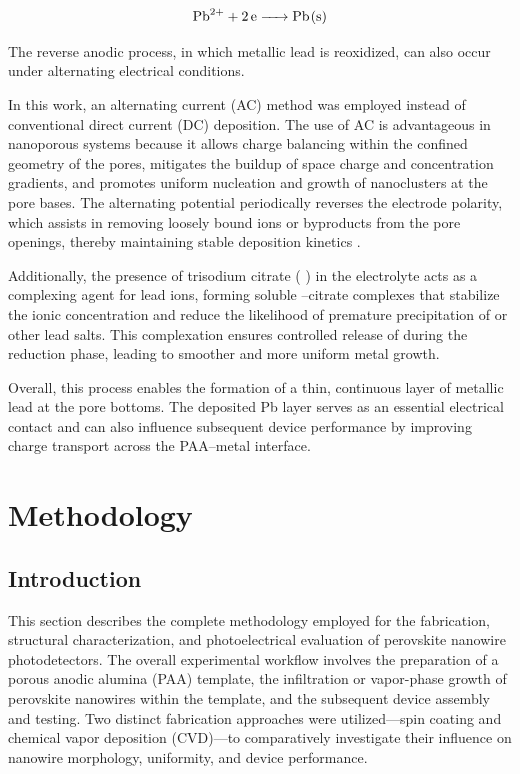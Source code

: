 \documentclass{rapportCS}
\begin{document}
	\begin{equation}
		\ce{Pb^{2+} + 2e -> Pb(s)}
		\label{eq:PbCathode}
	\end{equation}
	
	The reverse anodic process, in which metallic lead is reoxidized, can also occur under alternating electrical conditions.
	
	In this work, an alternating current (AC) method was employed instead of conventional direct current (DC) deposition. The use of AC is advantageous in nanoporous systems because it allows charge balancing within the confined geometry of the pores, mitigates the buildup of space charge and concentration gradients, and promotes uniform nucleation and growth of nanoclusters at the pore bases. The alternating potential periodically reverses the electrode polarity, which assists in removing loosely bound ions or byproducts from the pore openings, thereby maintaining stable deposition kinetics \cite{gu20163d}.
	
	Additionally, the presence of trisodium citrate ( ) in the electrolyte acts as a complexing agent for lead ions, forming soluble –citrate complexes that stabilize the ionic concentration and reduce the likelihood of premature precipitation of  or other lead salts. This complexation ensures controlled release of 
	during the reduction phase, leading to smoother and more uniform metal growth.
	
	Overall, this process enables the formation of a thin, continuous layer of metallic lead at the pore bottoms. The deposited Pb layer serves as an essential electrical contact and can also influence subsequent device performance by improving charge transport across the PAA–metal interface.
	
	
	
	\section{Methodology}
	
	
	
	\subsection{Introduction}
	
	This section describes the complete methodology employed for the fabrication, structural characterization, and photoelectrical evaluation of perovskite nanowire photodetectors. The overall experimental workflow involves the preparation of a porous anodic alumina (PAA) template, the infiltration or vapor-phase growth of perovskite nanowires within the template, and the subsequent device assembly and testing. Two distinct fabrication approaches were utilized—spin coating and chemical vapor deposition (CVD)—to comparatively investigate their influence on nanowire morphology, uniformity, and device performance.
	
\end{document}
